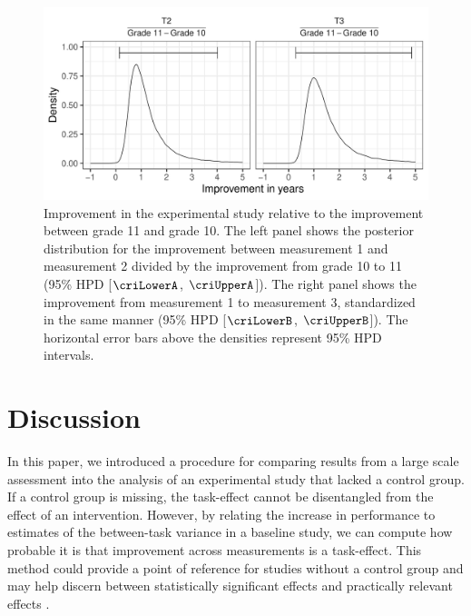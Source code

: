 \documentclass[a4paper]{article}
\newcommand{\setVal}[4]{%
	\pgfplotstablegetelem{#1}{#2}\of{#3}%
	\pgfmathprintnumberto{\pgfplotsretval}{#4}%
}
\newcommand{\DONa}	[1]		{\todo[inline, linecolor=gray, backgroundcolor=white]	{Don:	{#1}}}
\begin{document}
\tbCRIimprovement
\setVal{0}{lower}{\tbCRIimprovement}{\criLowerA}
\setVal{0}{upper}{\tbCRIimprovement}{\criUpperA}
\setVal{1}{lower}{\tbCRIimprovement}{\criLowerB}
\setVal{1}{upper}{\tbCRIimprovement}{\criUpperB}
\begin{figure}[!ht]
	\includegraphics[width=\textwidth]{improvementInYears.pdf}
	\caption{Improvement in the experimental study relative to the improvement between grade 11 and grade 10. The left panel shows the posterior distribution for the improvement between measurement 1 and measurement 2 divided by the improvement from grade 10 to 11 (95\% HPD [$\criLowerA$, $\criUpperA$]). The right panel shows the improvement from measurement 1 to measurement 3, standardized in the same manner (95\% HPD [$\criLowerB$, $\criUpperB$]). The horizontal error bars above the densities represent 95\% HPD intervals.}
	\label{fig:improvementInYears}
\end{figure}

\section*{Discussion}
In this paper, we introduced a procedure for comparing results from a large scale assessment into the analysis of an experimental study that lacked a control group.
If a control group is missing, the task-effect cannot be disentangled from the effect of an intervention.
However, by relating the increase in performance to estimates of the between-task variance in a baseline study, we can compute how probable it is that improvement across measurements is a task-effect.
This method could provide a point of reference for studies without a control group and may help discern between statistically significant effects and practically relevant effects
\cite{hojat2004visitor, fan2001statistical}.
\end{document}
